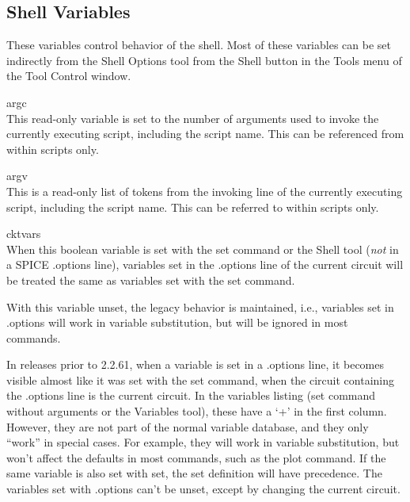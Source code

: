 \subsection{Shell Variables}


These variables control behavior of the {\WRspice} shell.  Most of
these variables can be set indirectly from the {\cb Shell Options}
tool from the {\cb Shell} button in the {\cb Tools} menu of the {\cb
Tool Control} window.

\begin{description}
\item{\et argc}\\
This read-only variable is set to the number of arguments used to
invoke the currently executing script, including the script name. 
This can be referenced from within scripts only.

\item{\et argv}\\
This is a read-only list of tokens from the invoking line of the
currently executing script, including the script name.  This can be
referred to within scripts only.

\item{\et cktvars}\\
When this boolean variable is set with the {\cb set} command or the
{\cb Shell} tool ({\it not} in a SPICE {\vt .options} line), variables
set in the {\vt .options} line of the current circuit will be treated
the same as variables set with the {\cb set} command.

With this variable unset, the legacy behavior is maintained, i.e.,
variables set in {\vt .options} will work in variable substitution,
but will be ignored in most commands.

In releases prior to 2.2.61, when a variable is set in a {\vt
.options} line, it becomes visible almost like it was set with the
{\cb set} command, when the circuit containing the {\vt .options} line
is the current circuit.  In the variables listing ({\cb set} command
without arguments or the {\cb Variables} tool), these have a `+' in
the first column.  However, they are not part of the normal variable
database, and they only ``work'' in special cases.  For example, they
will work in variable substitution, but won't affect the defaults in
most commands, such as the {\cb plot} command.  If the same variable
is also set with {\cb set}, the {\cb set} definition will have
precedence.  The variables set with {\vt .options} can't be unset,
except by changing the current circuit.


\end{description}
